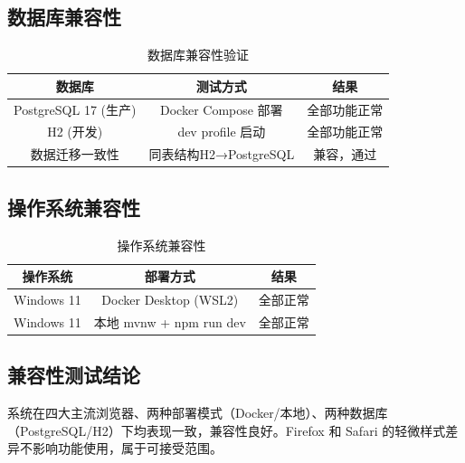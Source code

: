 \subsection{数据库兼容性}

\begin{table}[htbp]
    \centering
    \caption{数据库兼容性验证}
    \begin{tabular}{|c|c|c|}
        \hline
        \textbf{数据库} & \textbf{测试方式} & \textbf{结果} \\
        \hline
        PostgreSQL 17 (生产) & Docker Compose 部署 & 全部功能正常 \\
        \hline
        H2 (开发) & dev profile 启动 & 全部功能正常 \\
        \hline
        数据迁移一致性 & 同表结构H2→PostgreSQL & 兼容，通过 \\
        \hline
    \end{tabular}
\end{table}

\subsection{操作系统兼容性}

\begin{table}[htbp]
    \centering
    \caption{操作系统兼容性}
    \begin{tabular}{|c|c|c|}
        \hline
        \textbf{操作系统} & \textbf{部署方式} & \textbf{结果} \\
        \hline
        Windows 11 & Docker Desktop (WSL2) & 全部正常 \\
        \hline
        Windows 11 & 本地 mvnw + npm run dev & 全部正常 \\
        \hline
    \end{tabular}
\end{table}

\subsection{兼容性测试结论}

系统在四大主流浏览器、两种部署模式（Docker/本地）、两种数据库（PostgreSQL/H2）下均表现一致，兼容性良好。Firefox 和 Safari 的轻微样式差异不影响功能使用，属于可接受范围。

